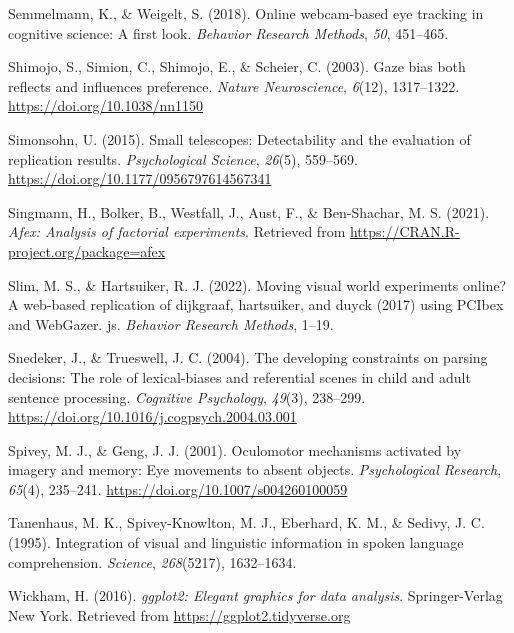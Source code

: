 \documentclass[
  man,floatsintext]{apa6}
\newlength{\cslhangindent}
\newlength{\cslentryspacingunit} %
\newenvironment{CSLReferences}[2] %
 {%
  \setlength{\parindent}{0pt}
  \ifodd #1
  \let\oldpar\par
  \def\par{\hangindent=\cslhangindent\oldpar}
  \fi
  \setlength{\parskip}{#2\cslentryspacingunit}
 }%
 {}
\begin{document}
\begin{CSLReferences}{1}{0}
\leavevmode{}%
Semmelmann, K., \& Weigelt, S. (2018). Online webcam-based eye tracking in cognitive science: A first look. \emph{Behavior Research Methods}, \emph{50}, 451--465.

\leavevmode{}%
Shimojo, S., Simion, C., Shimojo, E., \& Scheier, C. (2003). Gaze bias both reflects and influences preference. \emph{Nature Neuroscience}, \emph{6}(12), 1317--1322. \url{https://doi.org/10.1038/nn1150}

\leavevmode{}%
Simonsohn, U. (2015). Small telescopes: Detectability and the evaluation of replication results. \emph{Psychological Science}, \emph{26}(5), 559--569. \url{https://doi.org/10.1177/0956797614567341}

\leavevmode{}%
Singmann, H., Bolker, B., Westfall, J., Aust, F., \& Ben-Shachar, M. S. (2021). \emph{Afex: Analysis of factorial experiments}. Retrieved from \url{https://CRAN.R-project.org/package=afex}

\leavevmode{}%
Slim, M. S., \& Hartsuiker, R. J. (2022). Moving visual world experiments online? A web-based replication of dijkgraaf, hartsuiker, and duyck (2017) using PCIbex and WebGazer. js. \emph{Behavior Research Methods}, 1--19.

\leavevmode{}%
Snedeker, J., \& Trueswell, J. C. (2004). The developing constraints on parsing decisions: {The} role of lexical-biases and referential scenes in child and adult sentence processing. \emph{Cognitive Psychology}, \emph{49}(3), 238--299. \url{https://doi.org/10.1016/j.cogpsych.2004.03.001}

\leavevmode{}%
Spivey, M. J., \& Geng, J. J. (2001). Oculomotor mechanisms activated by imagery and memory: Eye movements to absent objects. \emph{Psychological Research}, \emph{65}(4), 235--241. \url{https://doi.org/10.1007/s004260100059}

\leavevmode{}%
Tanenhaus, M. K., Spivey-Knowlton, M. J., Eberhard, K. M., \& Sedivy, J. C. (1995). Integration of visual and linguistic information in spoken language comprehension. \emph{Science}, \emph{268}(5217), 1632--1634.

\leavevmode{}%
Wickham, H. (2016). \emph{ggplot2: Elegant graphics for data analysis}. Springer-Verlag New York. Retrieved from \url{https://ggplot2.tidyverse.org}


\end{CSLReferences}
\end{document}
